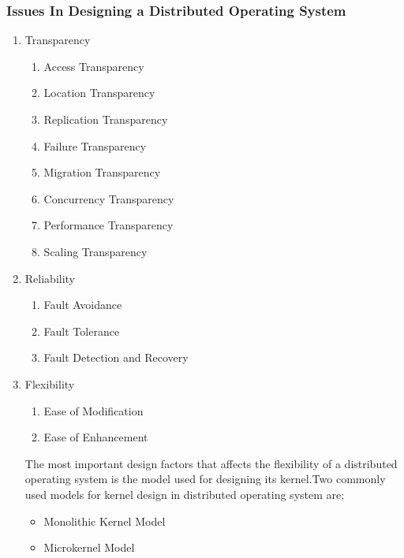 \documentclass{beamer}
\begin{document}
\begin{frame}[allowframebreaks]
    \frametitle{Issues In Designing a Distributed Operating System}
    \begin{enumerate}
      	\item {Transparency
      	\begin{enumerate}
      		\item Access Transparency
        	\item Location Transparency
        	\item Replication Transparency
        	\item Failure Transparency
        	\item Migration Transparency
        	\item Concurrency Transparency
        	\item Performance Transparency
        	\item Scaling Transparency
      	\end{enumerate}}
      	\vspace{4cm}
      	\framebreak
      	\item {Reliability
      	\begin{enumerate}
      		\item Fault Avoidance
      		\item Fault Tolerance
      		\item Fault Detection and Recovery
      	\end{enumerate}}
      	\vspace{6cm}
      	\framebreak
      	\item {Flexibility
      	\begin{enumerate}
      		\item Ease of Modification
      		\item Ease of Enhancement
      	\end{enumerate}}
      	\vspace{1cm}
      	The most important design factors that affects the flexibility of a distributed operating system is the model used for designing its kernel.Two commonly used models for kernel design in distributed operating system are;
      	\vspace{0.5cm}
      	\begin{itemize}
      		\item Monolithic Kernel Model
      		\item Microkernel Model
      	\end{itemize}
      	\framebreak
      	\begin{itemize}

\end{itemize}
\end{enumerate}
\end{frame}
\end{document}
